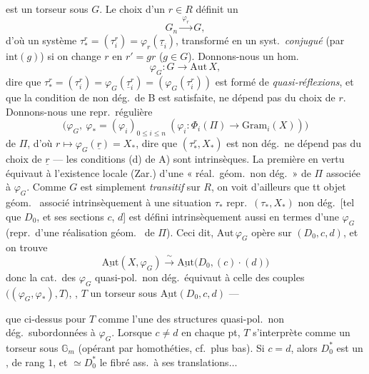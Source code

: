 \documentclass[11pt,a4paper]{article}
\begin{document}
est un torseur sous $G$. Le choix d'un $r \in R$ définit un 
\[
G_n \xrightarrow{\ \varphi_r\ } G ,
\]
d'où un système $\tau^r_* = (\tau^r_i) = \varphi_r(\underline{\tau}_i)$, transformé en un syst.\ \emph{conjugué} (par $\mathrm{int}(g)$) si on change $r$ en $r' = gr$ ($g \in G$). Donnons-nous un hom.
\[
\varphi_G : G \longrightarrow \mathrm{Aut}\, X ,
\]
dire que $\tau^r_* = (\tau^r_i) = \varphi_G(\underline{\tau}^r_i) = (\varphi_G(\tau^r_i))$ est formé de \emph{quasi-réflexions}, et que la condition de non dég.\ de B est satisfaite, ne dépend pas du choix de $r$. Donnons-nous une repr.\ régulière
\[
\bigl(\varphi_G,\ \varphi_* = (\varphi_i)_{0 \leq i \leq n}\ (\varphi_i : \Phi_i(\Pi) \to \mathrm{Gram}_i(X))\bigr)
\]
de $\Pi$, d'où $r \mapsto \varphi_G(\underline{r}) = X_*$, dire que $(\tau^r_*, X_*)$ est non dég.\ ne dépend pas du choix de $\underline{r}$ ---   les conditions  (d) de A) sont intrinsèques. La première en vertu \ill{} équivaut à l'existence locale (Zar.) d'une « réal.\ géom.\ non dég.\ » de $\Pi$ associée à $\varphi_G$.   Comme $G$ est simplement \emph{transitif} sur $R$, on voit d'ailleurs que tt objet géom.\ \ill{} associé intrinsèquement à une situation $\tau_*$ repr.\ $(\tau_*, X_*)$ non dég.\ [tel que $D_0$, et ses sections $c$, $d$] est défini intrinsèquement aussi en termes d'une $\varphi_G$  (repr.\ d'une réalisation géom.\  de $\Pi$). Ceci dit, $\mathrm{Aut}\, \varphi_G$ opère sur $(D_0, c, d)$, et on trouve
\[
\underline{\mathrm{Aut}}(X, \varphi_G) \xrightarrow{\ \sim\ } \underline{\mathrm{Aut}}\bigl(D_0, (c) \cdot (d)\bigr)
\]
donc la cat.\ des $\varphi_G$ quasi-pol.\ non dég.\ équivaut à celle des couples \struck{\ill{}} $\bigl((\varphi_G, \varphi_*), T\bigr)$, , $T$ un torseur sous $\underline{\mathrm{Aut}}(D_0, c, d)$ --- \ill{}

que ci-dessus pour $T$ comme l'une des structures quasi-pol.\ non dég.\ subordonnées à $\varphi_G$. Lorsque $c \neq d$ en chaque pt, $T$ s'interprète comme un torseur sous $\mathbb{G}_m$ (opérant par homothéties, cf.\ plus bas). Si $c = d$, alors $D_0^*$  est un ,   de rang $1$,  et \ill{} $\simeq D_0^*$ le fibré  ass.\ à ses translations$\dots$
\end{document}
